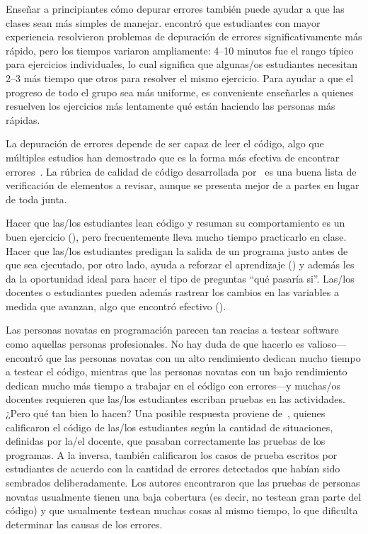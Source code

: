 Enseñar a principiantes cómo depurar errores también puede ayudar a que las clases sean más simples de manejar.
\cite{Alqa2017} encontró que estudiantes con mayor experiencia resolvieron problemas de depuración de errores significativamente más rápido,
pero los tiempos variaron ampliamente:
4--10 minutos fue el rango típico para ejercicios individuales,
lo cual significa que algunas/os estudiantes necesitan 2--3 más tiempo que otros para resolver el mismo ejercicio.
Para ayudar a que el progreso de todo el grupo sea más uniforme,
es conveniente enseñarles a quienes resuelven los ejercicios más lentamente qué están haciendo las personas más rápidas.

La depuración de errores depende de ser capaz de leer el código,
algo que múltiples estudios han demostrado que es la forma más efectiva de encontrar errores~\cite{Basi1987,Keme2009,Bacc2013}.
La rúbrica de calidad de código desarrollada por~\cite{Steg2014,Steg2016a}
es una buena lista de verificación de elementos a revisar,
aunque se presenta mejor de a partes  en lugar  de toda junta.

Hacer que las/los estudiantes lean código y resuman su comportamiento es un buen ejercicio (),
pero frecuentemente lleva mucho tiempo practicarlo en clase.
Hacer que las/los estudiantes predigan la salida de un programa justo antes de que sea ejecutado,
por otro lado,
ayuda a reforzar el aprendizaje ()
y además les da la oportunidad ideal para hacer el tipo de preguntas ``qué pasaría si''.
Las/los docentes o estudiantes pueden además rastrear los cambios en las variables a medida que avanzan,
algo que \cite{Cunn2017} encontró efectivo ().


Las personas novatas en programación parecen tan reacias a testear software como aquellas personas profesionales.
No hay duda de que hacerlo es valioso---\cite{Cart2017} encontró que
las personas novatas con un alto rendimiento dedican mucho tiempo a testear el código,
mientras que las personas novatas con un bajo rendimiento dedican mucho más tiempo a trabajar en el código con errores---y muchas/os docentes
requieren que las/los estudiantes escriban pruebas en las actividades.
¿Pero qué tan bien lo hacen?
Una posible respuesta proviene de~\cite{Bria2015},
quienes calificaron el código de las/los estudiantes según la cantidad de situaciones, definidas por la/el docente, que pasaban correctamente las pruebas de los programas.
A la inversa, también calificaron
los casos de prueba escritos por estudiantes de acuerdo con la cantidad de errores detectados que habían sido sembrados deliberadamente.
Los autores encontraron que las pruebas de personas novatas usualmente tienen una baja cobertura (es decir, no testean gran parte del código)
y que usualmente testean muchas cosas al mismo tiempo, lo que dificulta determinar las causas de los errores.

